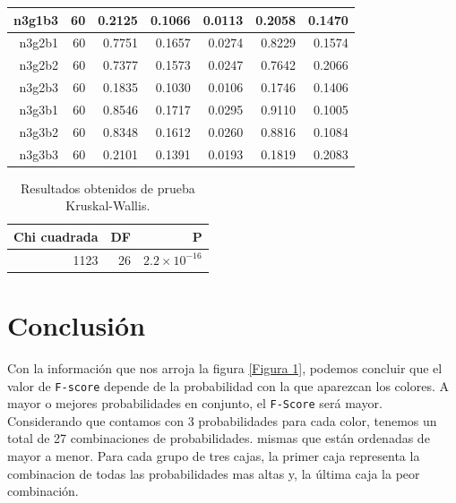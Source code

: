 \documentclass{article}
\begin{document}
\begin{table}[htb]
\begin{tabular}{|r|r|r|r|r|r|r|}
    \hline
    n3g1b3 & 60 & 0.2125 & 0.1066 & 0.0113 & 0.2058 & 0.1470 \\
    \hline
    n3g2b1 & 60 & 0.7751 & 0.1657 & 0.0274 & 0.8229 & 0.1574 \\
    \hline
    n3g2b2 & 60 & 0.7377 & 0.1573 & 0.0247 & 0.7642 & 0.2066 \\
    \hline
    n3g2b3 & 60 & 0.1835 & 0.1030 & 0.0106 & 0.1746 & 0.1406 \\
    \hline
    n3g3b1 & 60 & 0.8546 & 0.1717 & 0.0295 & 0.9110 & 0.1005 \\
    \hline
    n3g3b2 & 60 & 0.8348 & 0.1612 & 0.0260 & 0.8816 & 0.1084 \\
    \hline
    n3g3b3 & 60 & 0.2101 & 0.1391 & 0.0193 & 0.1819 & 0.2083 \\
    \hline
\end{tabular}
    \label{cuadro 3}
\end{table}

\begin{table}[ht]
    \centering
    \caption{Resultados obtenidos de prueba Kruskal-Wallis.} 
    \begin{tabular}{|r|r|r|}
    \hline
    Chi cuadrada & DF & P  \\
    \hline
    1123 & 26 & $2.2\times 10^{-16}$ \\
    \hline
\end{tabular}
    \label{cuadro 4}
\end{table}





\section{Conclusi\'on}
Con la informaci\'on que nos arroja la figura \ref{Figura 1}, podemos concluir que el valor de \texttt{F-score} depende de la probabilidad con la que aparezcan los colores. \newline
A mayor o mejores probabilidades en conjunto, el \texttt{F-Score}  ser\'a mayor.
Considerando que contamos con 3 probabilidades para cada color, tenemos un total de 27 combinaciones de probabilidades. mismas que est\'an ordenadas de mayor a menor. Para cada grupo de tres cajas, la primer caja representa la combinacion de todas las probabilidades mas altas y, la \'ultima caja la peor combinaci\'on.





\end{document}
